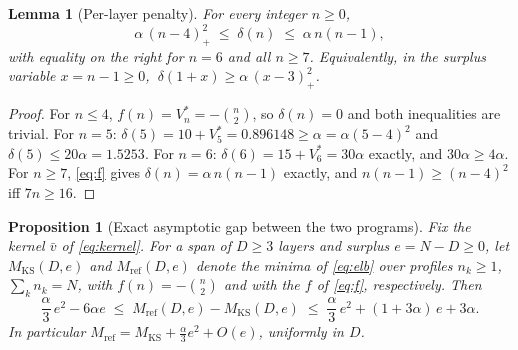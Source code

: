 \documentclass[11pt]{article}
\newtheorem{lemma}{Lemma}
\newtheorem{proposition}{Proposition}
\theoremstyle{remark}
\newcommand{\KS}{\mathrm{KS}}
\newcommand{\refi}{\mathrm{ref}}
\begin{document}
\begin{lemma}[Per-layer penalty]\label{lem:penalty}
For every integer $n\ge0$,
\[
\alpha\,(n-4)_+^2 \;\le\; \delta(n) \;\le\; \alpha\,n(n-1),
\]
with equality on the right for $n=6$ and all $n\ge7$. Equivalently, in the surplus variable $x=n-1\ge0$, $\ \delta(1+x)\ge\alpha\,(x-3)_+^2$.
\end{lemma}

\begin{proof}
For $n\le4$, $f(n)=V^*_n=-\binom n2$, so $\delta(n)=0$ and both inequalities are trivial. For $n=5$: $\delta(5)=10+V^*_5=0.896148\ge\alpha=\alpha(5-4)^2$ and $\delta(5)\le20\alpha=1.5253$. For $n=6$: $\delta(6)=15+V^*_6=30\alpha$ exactly, and $30\alpha\ge4\alpha$. For $n\ge7$, \eqref{eq:f} gives $\delta(n)=\alpha\,n(n-1)$ exactly, and $n(n-1)\ge(n-4)^2$ iff $7n\ge16$.
\end{proof}

\begin{proposition}[Exact asymptotic gap between the two programs]\label{prop:gap}
Fix the kernel $\bar v$ of \eqref{eq:kernel}. For a span of $D\ge3$ layers and surplus $e=N-D\ge0$, let $M_\KS(D,e)$ and $M_\refi(D,e)$ denote the minima of \eqref{eq:elb} over profiles $n_k\ge1$, $\sum_k n_k=N$, with $f(n)=-\binom n2$ and with the $f$ of \eqref{eq:f}, respectively. Then
\[
\frac\alpha3\,e^2 - 6\alpha e
\;\le\;
M_\refi(D,e)-M_\KS(D,e)
\;\le\;
\frac\alpha3\,e^2 + (1+3\alpha)\,e + 3\alpha.
\]
In particular $M_\refi=M_\KS+\frac\alpha3 e^2+O(e)$, uniformly in $D$.
\end{proposition}
\end{document}
